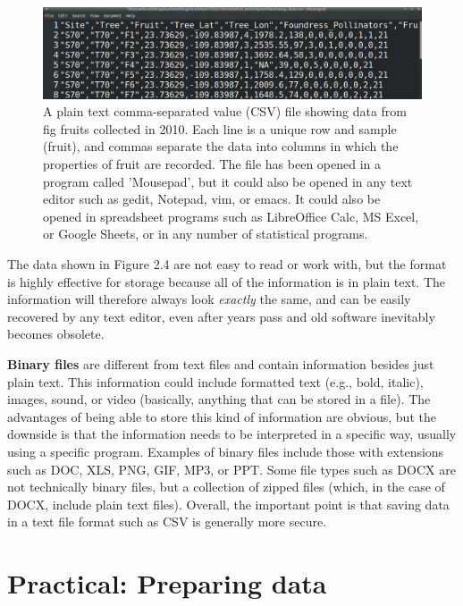 \documentclass[
]{scrbook}
\begin{document}
\begin{figure}
\includegraphics[width=1\linewidth]{img/wasp_data_csv} \caption{A plain text comma-separated value (CSV) file showing data from fig fruits collected in 2010. Each line is a unique row and sample (fruit), and commas separate the data into columns in which the properties of fruit are recorded. The file has been opened in a program called 'Mousepad', but it could also be opened in any text editor such as gedit, Notepad, vim, or emacs. It could also be opened in spreadsheet programs such as LibreOffice Calc, MS Excel, or Google Sheets, or in any number of statistical programs.}\label{fig:unnamed-chunk-7}
\end{figure}

The data shown in Figure 2.4 are not easy to read or work with, but the format is highly effective for storage because all of the information is in plain text.
The information will therefore always look \emph{exactly} the same, and can be easily recovered by any text editor, even after years pass and old software inevitably becomes obsolete.

\textbf{Binary files} are different from text files and contain information besides just plain text.
This information could include formatted text (e.g., bold, italic), images, sound, or video (basically, anything that can be stored in a file).
The advantages of being able to store this kind of information are obvious, but the downside is that the information needs to be interpreted in a specific way, usually using a specific program.
Examples of binary files include those with extensions such as DOC, XLS, PNG, GIF, MP3, or PPT.
Some file types such as DOCX are not technically binary files, but a collection of zipped files (which, in the case of DOCX, include plain text files).
Overall, the important point is that saving data in a text file format such as CSV is generally more secure.

\hypertarget{Chapter_3}{%
\chapter{Practical: Preparing data}\label{Chapter_3}}
\end{document}
